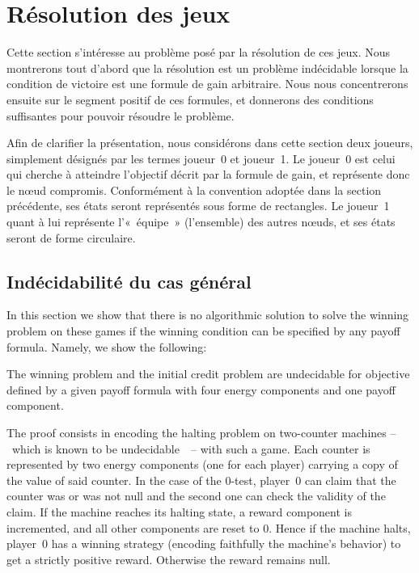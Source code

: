 \section{Résolution des jeux}
\label{tj:sec:algo}

Cette section s'intéresse au problème posé par la résolution de ces jeux.
Nous montrerons tout d'abord que la résolution est un problème indécidable lorsque la condition de victoire est une formule de gain arbitraire.
Nous nous concentrerons ensuite sur le segment positif de ces formules, et donnerons des conditions suffisantes pour pouvoir résoudre le problème.

\newcommand\jo{joueur~0\xspace}
\newcommand\ji{joueur~1\xspace}
Afin de clarifier la présentation, nous considérons dans cette section deux joueurs, simplement désignés par les termes \jo et \ji.
Le \jo est celui qui cherche à atteindre l'objectif décrit par la formule de gain, et représente donc le nœud compromis.
Conformément à la convention adoptée dans la section précédente, ses états seront représentés sous forme de rectangles.
Le \ji quant à lui représente l'« équipe » (l'ensemble) des autres nœuds, et ses états seront de forme circulaire.

\subsection{Indécidabilité du cas général}

In this section we show that there is no algorithmic solution to solve the winning problem on these games if the winning condition can be specified by any payoff formula.
Namely, we show the following:
\begin{theorem}
The winning problem and the initial credit problem are undecidable for objective defined by a given payoff formula with four energy components and one payoff component.
\end{theorem}

The proof consists in encoding the halting problem on two-counter machines --~which is known to be undecidable~\cite{minsky67}~-- with such a game.
Each counter is represented by two energy components (one for each player) carrying a copy of the value of said counter.
In the case of the $0$-test, player~0 can claim that the counter was or was not null and the second one can check the validity of the claim.
If the machine reaches its halting state, a reward component is incremented, and all other components are reset to $0$.
Hence if the machine halts, player~0 has a winning strategy (encoding faithfully the machine's behavior) to get a strictly positive reward.
Otherwise the reward remains null. 

